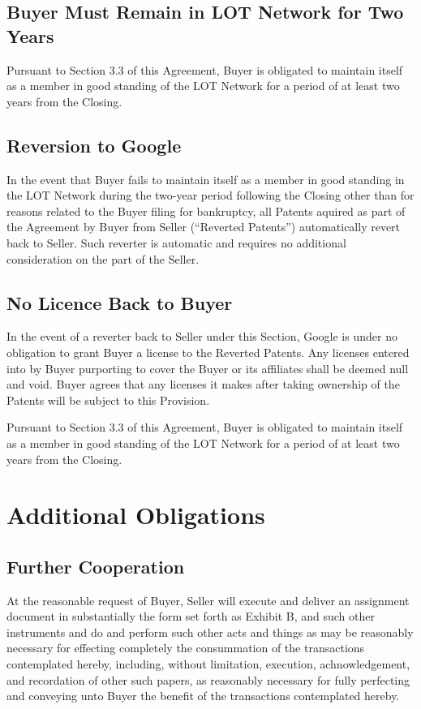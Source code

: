 \documentclass[letterpaper,10pt,openany,oneside,english]{sphinxmanual}
\begin{document}
\subsection{Buyer Must Remain in LOT Network for Two Years}
\label{\detokenize{4-reversionary:buyer-must-remain-in-lot-network-for-two-years}}
Pursuant to Section 3.3 of this Agreement, Buyer is obligated to maintain itself as a member in good standing of the LOT Network for a period of at least two years from the Closing.


\subsection{Reversion to Google}
\label{\detokenize{4-reversionary:reversion-to-google}}
In the event that Buyer fails to maintain itself as a member in good standing in the LOT Network during the two-year period following the Closing other than for reasons related to the Buyer filing for bankruptcy, all Patents aquired as part of the Agreement by Buyer from Seller (“Reverted Patents”) automatically revert back to Seller. Such reverter is automatic and requires no additional consideration on the part of the Seller.


\subsection{No Licence Back to Buyer}
\label{\detokenize{4-reversionary:no-licence-back-to-buyer}}
In the event of a reverter back to Seller under this Section, Google is under no obligation to grant Buyer a license to the Reverted Patents. Any licenses entered into by Buyer purporting to cover the Buyer or its affiliates shall be deemed null and void. Buyer agrees that any licenses it makes after taking ownership of the Patents will be subject to this Provision.

Pursuant to Section 3.3 of this Agreement, Buyer is obligated to maintain itself as a member in good standing of the LOT Network for a period of at least two years from the Closing.


\section{Additional Obligations}
\label{\detokenize{5-additionalobligations:additional-obligations}}\label{\detokenize{5-additionalobligations::doc}}

\subsection{Further Cooperation}
\label{\detokenize{5-additionalobligations:further-cooperation}}
At the reasonable request of Buyer, Seller will execute and deliver an assignment document in substantially the form set forth as Exhibit B, and such other instruments and do and perform such other acts and things as may be reasonably necessary for effecting completely the consummation of the transactions contemplated hereby, including, without limitation, execution, achnowledgement, and recordation of other such papers, as reasonably necessary for fully perfecting and conveying unto Buyer the benefit of the transactions contemplated hereby.
\end{document}
